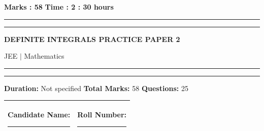 \documentclass[11pt,a4paper]{article}
\begin{document}
\vspace{2mm}
\noindent \textbf{Marks : 58} \hfill \textbf{Time : 2 : 30 hours}
\noindent\rule{\linewidth}{1.1pt}\vspace{-1mm}\noindent\rule{\linewidth}{0.5pt}
{\centering \Large \textbf{DEFINITE INTEGRALS PRACTICE PAPER 2}\par}
{\centering JEE $|$ Mathematics\par}
\noindent\rule{\linewidth}{1.1pt}\vspace{-1mm}\noindent\rule{\linewidth}{0.5pt}
\vspace{1mm}
\noindent \textbf{Duration:} Not specified \quad \textbf{Total Marks:} 58 \quad \textbf{Questions:} 25\par
\vspace{2mm}

\begin{tabularx}{\linewidth}{|X|X|}\hline
Candidate Name: \rule{6cm}{0.4pt} & Roll Number: \rule{3.5cm}{0.4pt} \\\hline
\end{tabularx}
\end{document}
